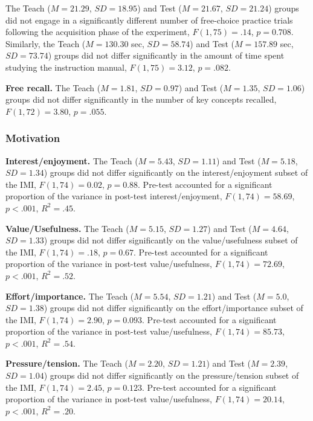 \documentclass[
  english,
  man,floatsintext]{apa7}
\begin{document}
The Teach (\(M = 21.29\), \(SD = 18.95\)) and Test (\(M = 21.67\), \(SD = 21.24\)) groups did not engage in a significantly different number of free-choice practice trials following the acquisition phase of the experiment, \(F(1,75) = .14\), \(p = 0.708\). Similarly, the Teach (\(M = 130.30\) sec, \(SD = 58.74\)) and Test (\(M = 157.89\) sec, \(SD = 73.74\)) groups did not differ significantly in the amount of time spent studying the instruction manual, \(F(1, 75) = 3.12\), \(p = .082\).

\textbf{Free recall.} The Teach (\(M = 1.81\), \(SD = 0.97\)) and Test (\(M = 1.35\), \(SD = 1.06\)) groups did not differ significantly in the number of key concepts recalled, \(F(1, 72) = 3.80\), \(p = .055\).

\hypertarget{motivation}{%
\subsubsection{Motivation}\label{motivation}}

\textbf{Interest/enjoyment.} The Teach (\(M = 5.43\), \(SD = 1.11\)) and Test (\(M = 5.18\), \(SD = 1.34\)) groups did not differ significantly on the interest/enjoyment subset of the IMI, \(F(1, 74) = 0.02\), \(p = 0.88\). Pre-test accounted for a significant proportion of the variance in post-test interest/enjoyment, \(F(1,74) = 58.69\), \(p < .001\), \(R^{2} = .45\).

\textbf{Value/Usefulness.} The Teach (\(M = 5.15\), \(SD = 1.27\)) and Test (\(M = 4.64\), \(SD = 1.33\)) groups did not differ significantly on the value/usefulness subset of the IMI, \(F(1,74) = .18\), \(p = 0.67\). Pre-test accounted for a significant proportion of the variance in post-test value/usefulness, \(F(1,74) = 72.69\), \(p < .001\), \(R^{2} = .52\).

\textbf{Effort/importance.} The Teach (\(M = 5.54\), \(SD = 1.21\)) and Test (\(M = 5.0\), \(SD = 1.38\)) groups did not differ significantly on the effort/importance subset of the IMI, \(F(1,74) = 2.90\), \(p = 0.093\). Pre-test accounted for a significant proportion of the variance in post-test value/usefulness, \(F(1,74) = 85.73\), \(p < .001\), \(R^{2} = .54\).

\textbf{Pressure/tension.} The Teach (\(M = 2.20\), \(SD = 1.21\)) and Test (\(M = 2.39\), \(SD = 1.04\)) groups did not differ significantly on the pressure/tension subset of the IMI, \(F(1,74) = 2.45\), \(p = 0.123\). Pre-test accounted for a significant proportion of the variance in post-test value/usefulness, \(F(1,74) = 20.14\), \(p < .001\), \(R^{2} = .20\).
\end{document}
